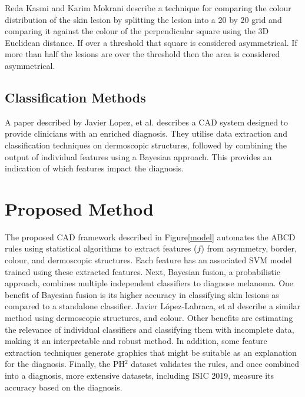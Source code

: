 Reda Kasmi and Karim Mokrani\cite{Kasmi2016} describe a technique for comparing the colour distribution of the skin lesion by splitting the lesion into a 20 by 20 grid and comparing it against the colour of the perpendicular square using the 3D Euclidean distance. If over a threshold that square is considered asymmetrical. If more than half the lesions are over the threshold then the area is considered asymmetrical.

\subsection{Classification Methods}
A paper described by Javier Lopez, et al.\cite{Lopez-Labraca2018} describes a CAD system designed to provide clinicians with an enriched diagnosis. They utilise data extraction and classification techniques on dermoscopic structures, followed by combining the output of individual features using a Bayesian approach. This provides an indication of which features impact the diagnosis.

\section{Proposed Method}
The proposed CAD framework described in Figure\ref{model} automates the ABCD rules using statistical algorithms to extract features ($f$) from asymmetry, border, colour, and dermoscopic structures. Each feature has an associated SVM model trained using these extracted features. Next, Bayesian fusion, a probabilistic approach, combines multiple independent classifiers to diagnose melanoma. One benefit of Bayesian fusion is its higher accuracy in classifying skin lesions as compared to a standalone classifier\cite{Takruri2017}.  Javier López-Labraca, et al describe a similar method using dermoscopic structures, and colour\cite{Lopez-Labraca2018}. Other benefits are estimating the relevance of individual classifiers and classifying them with incomplete data, making it an interpretable and robust method. In addition, some feature extraction techniques generate graphics that might be suitable as an explanation for the diagnosis. Finally, the PH$^2$ dataset validates the rules, and once combined into a diagnosis, more extensive datasets, including ISIC 2019, measure its accuracy based on the diagnosis.

